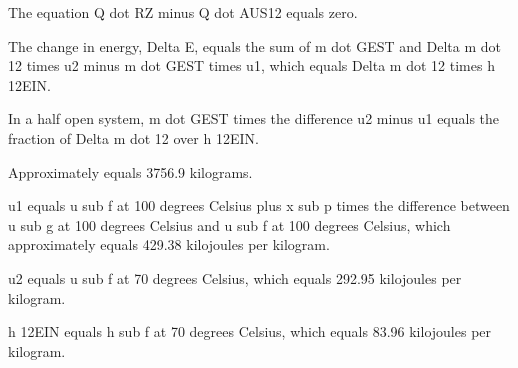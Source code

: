 The equation Q dot RZ minus Q dot AUS12 equals zero.

The change in energy, Delta E, equals the sum of m dot GEST and Delta m dot 12 times u2 minus m dot GEST times u1, which equals Delta m dot 12 times h 12EIN.

In a half open system, m dot GEST times the difference u2 minus u1 equals the fraction of Delta m dot 12 over h 12EIN.

Approximately equals 3756.9 kilograms.

u1 equals u sub f at 100 degrees Celsius plus x sub p times the difference between u sub g at 100 degrees Celsius and u sub f at 100 degrees Celsius, which approximately equals 429.38 kilojoules per kilogram.

u2 equals u sub f at 70 degrees Celsius, which equals 292.95 kilojoules per kilogram.

h 12EIN equals h sub f at 70 degrees Celsius, which equals 83.96 kilojoules per kilogram.